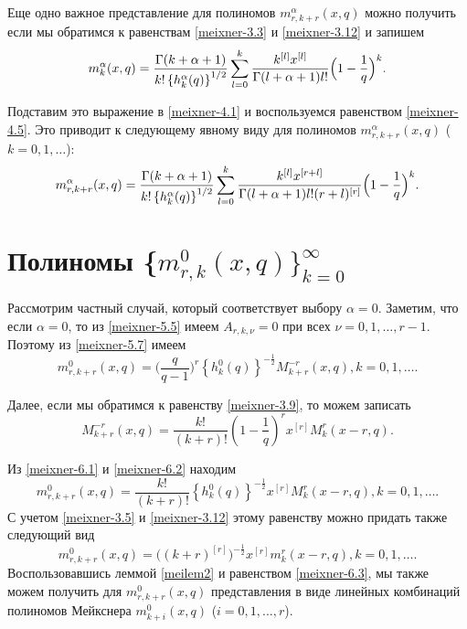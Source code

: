 Еще одно важное представление для полиномов $m_{r,k+r}^{\alpha}(x,q)$ можно получить если мы обратимся к равенствам \eqref{meixner-3.3} и \eqref{meixner-3.12} и запишем
\begin{equation}\label{meixner-5.8}
m_{k}^{\alpha}(x,q)={\Gamma(k+\alpha+1)\over
k!\left\{h_{k}^{\alpha}(q)\right\}^{1/2}}\sum_{l=0}^k {k^{[l]}x^{[l]}\over
\Gamma(l+\alpha+1) l!}\Big(1-\frac{1}{q}\Big)^k.
\end{equation}

Подставим это выражение в \eqref{meixner-4.1} и воспользуемся равенством \eqref{meixner-4.5}. Это приводит к следующему явному виду для полиномов  $m_{r,k+r}^{\alpha}(x,q)$ ($k=0,1,\ldots$):
\begin{equation}\label{meixner-5.9}
m_{r,k+r}^{\alpha}(x,q)={\Gamma(k+\alpha+1)\over
k!\left\{h_{k}^{\alpha}(q)\right\}^{1/2}}\sum_{l=0}^k {k^{[l]}x^{[r+l]}\over
\Gamma(l+\alpha+1) l!(r+l)^{[r]}}\Big(1-\frac{1}{q}\Big)^k.
\end{equation}

\section{Полиномы \{$m_{r,k}^0(x,q)\}_{k=0}^\infty $}

Рассмотрим  частный случай, который соответствует выбору $\alpha=0$.
 Заметим, что если $\alpha=0$, то из \eqref{meixner-5.5} имеем $A_{r,k,\nu}=0$ при всех  $\nu=0,1,\dots, r-1$. Поэтому  из \eqref{meixner-5.7}  имеем
\begin{equation}\label{meixner-6.1}
m_{r,k+r}^{0}(x,q)=\big(\frac{q}{q-1}\big)^r\left\{h_{k}^{0}(q)\right\}^{-\frac12}
M_{k+r}^{-r}(x,q), k=0,1,\ldots.
\end{equation}

Далее, если мы обратимся к равенству \eqref{meixner-3.9}, то можем записать
\begin{equation}\label{meixner-6.2}
M_{k+r}^{-r}(x,q)=\frac{k!}{(k+r)!}\left(1-\frac1q\right)^rx^{[r]}M_{k}^{r}(x-r,q).
  \end{equation}

Из \eqref{meixner-6.1} и \eqref{meixner-6.2} находим
\begin{equation}\label{meixner-6.3}
m_{r,k+r}^{0}(x,q)=\frac{k!}{(k+r)!}\left\{h_{k}^{0}(q)\right\}^{-\frac12}x^{[r]}
M_{k}^{r}(x-r,q), k=0,1,\ldots.
\end{equation}
С учетом \eqref{meixner-3.5} и \eqref{meixner-3.12} этому равенству можно придать также следующий вид
\begin{equation}\label{meixner-6.4}
m_{r,k+r}^{0}(x,q)=\Big((k+r)^{[r]}\Big)^{-\frac12}x^{[r]}
m_{k}^{r}(x-r,q), k=0,1,\ldots.
\end{equation}
Воспользовавшись леммой \eqref{meilem2} и равенством \eqref{meixner-6.3}, мы  также можем получить для $m_{r,k+r}^{0}(x,q)$ представления в виде линейных комбинаций полиномов Мейкснера
$m_{k+i}^0(x,q)$ ($i=0,1,\ldots,r$).


